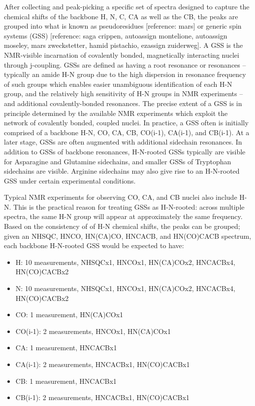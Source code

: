 After collecting and peak-picking a specific set of spectra designed to 
capture the chemical shifts of the backbone H, N, C, CA as well as the CB, 
the peaks are grouped into what is known as pseudoresidues [reference: mars] 
or generic spin systems (GSS) [reference: saga crippen, autoassign montelione, 
autoassign moseley, mars zweckstetter, hamid pistachio, ezassign zuiderweg].  
A GSS is the NMR-visible incarnation of covalently bonded, magnetically 
interacting nuclei through j-coupling.  GSSs are defined as having a root 
resonance or resonances -- typically an amide H-N group due to the high 
dispersion in resonance frequency of such groups which enables easier 
unambiguous identification of each H-N group, and the relatively high 
sensitivity of H-N groups in NMR experiments -- and additional 
covalently-bonded resonances.  The precise extent of a GSS is in principle 
determined by the available NMR experiments which exploit the network of 
covalently bonded, coupled nuclei.  In practice, a GSS often is initially 
comprised of a backbone H-N, CO, CA, CB, CO(i-1), CA(i-1), and CB(i-1).  
At a later stage, GSSs are often augmented with additional sidechain resonances.  
In addition to GSSs of backbone resonances, H-N-rooted GSSs typically are 
visible for Asparagine and Glutamine sidechains, and smaller GSSs of 
Tryptophan sidechains are visible.  Arginine sidechains may also give rise 
to an H-N-rooted GSS under certain experimental conditions. 
	
Typical NMR experiments for observing CO, CA, and CB nuclei also include H-N.  
This is the practical reason for treating GSSs as H-N-rooted: across multiple 
spectra, the same H-N group will appear at approximately the same frequency.  
Based on the consistency of of H-N chemical shifts, the peaks can be grouped; 
given an NHSQC, HNCO, HN(CA)CO, HNCACB, and HN(CO)CACB spectrum, each backbone 
H-N-rooted GSS would be expected to have:
\begin{itemize}
 \item H: 10 measurements, NHSQCx1, HNCOx1, HN(CA)COx2, HNCACBx4, HN(CO)CACBx2
 \item N: 10 measurements, NHSQCx1, HNCOx1, HN(CA)COx2, HNCACBx4, HN(CO)CACBx2
 \item CO: 1 measurement, HN(CA)COx1
 \item CO(i-1): 2 measurements, HNCOx1, HN(CA)COx1
 \item CA: 1 measurement, HNCACBx1
 \item CA(i-1): 2 measurements, HNCACBx1, HN(CO)CACBx1
 \item CB: 1 measurement, HNCACBx1
 \item CB(i-1): 2 measurements, HNCACBx1, HN(CO)CACBx1
\end{itemize}

